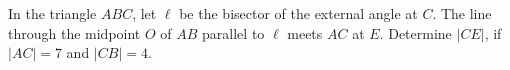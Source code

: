 In the triangle $ABC$,  let $\ell$ be the bisector of the external angle at $C$. The line through the midpoint $O$ of $AB$ parallel to $\ell$ meets $AC$ at $E$. Determine $|CE|$,  if $|AC|=7$ and $|CB|=4$.